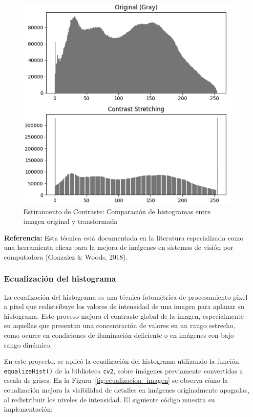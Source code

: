 \documentclass[12pt,letterpaper]{article}
\begin{document}
\begin{figure}[H]
  \centering
  \includegraphics[width=0.8\linewidth]{figuras/estiramiento_de_contraste_justificacion.png}
  \caption{Estiramiento de Contraste: Comparación de histogramas entre imagen original y transformada}
  \label{fig:estiramiento_de_contraste_justificacion}
\end{figure}

\textbf{Referencia:} Esta técnica está documentada en la literatura especializada como una herramienta eficaz para la mejora de imágenes en sistemas de visión por computadora (Gonzalez & Woods, 2018).

\subsubsection{Ecualización del histograma}
La ecualización del histograma es una técnica fotométrica de procesamiento pixel a pixel que redistribuye los valores de intensidad de una imagen para aplanar su histograma. Este proceso mejora el contraste global de la imagen, especialmente en aquellas que presentan una concentración de valores en un rango estrecho, como ocurre en condiciones de iluminación deficiente o en imágenes con bajo rango dinámico.

En este proyecto, se aplicó la ecualización del histograma utilizando la función \texttt{equalizeHist()} de la biblioteca \texttt{cv2}, sobre imágenes previamente convertidas a escala de grises. En la Figura~\ref{fig:ecualizacion_imagen} se observa cómo la ecualización mejora la visibilidad de detalles en imágenes originalmente apagadas, al redistribuir los niveles de intensidad. El siguiente código muestra su implementación:
\end{document}
